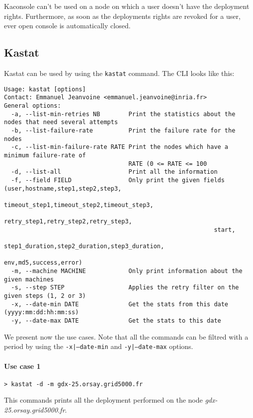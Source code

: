 \documentclass[a4wide,10pt,oneside]{book}
\begin{document}
Kaconsole can't be used on a node on which a user doesn't have the deployment rights. Furthermore, as soon as the deployments rights are revoked for a user, ever open console is automatically closed.

\subsection{Kastat}\label{sec:kastat}
Kastat can be used by using the \texttt{kastat} command. The CLI looks like this:
\begin{small}
\begin{verbatim}
Usage: kastat [options]
Contact: Emmanuel Jeanvoine <emmanuel.jeanvoine@inria.fr>
General options:
  -a, --list-min-retries NB        Print the statistics about the nodes that need several attempts
  -b, --list-failure-rate          Print the failure rate for the nodes
  -c, --list-min-failure-rate RATE Print the nodes which have a minimum failure-rate of 
                                   RATE (0 <= RATE <= 100
  -d, --list-all                   Print all the information
  -f, --field FIELD                Only print the given fields (user,hostname,step1,step2,step3,
                                                           timeout_step1,timeout_step2,timeout_step3,
                                                           retry_step1,retry_step2,retry_step3,
                                                           start,
                                                           step1_duration,step2_duration,step3_duration,
                                                           env,md5,success,error)
  -m, --machine MACHINE            Only print information about the given machines
  -s, --step STEP                  Applies the retry filter on the given steps (1, 2 or 3)
  -x, --date-min DATE              Get the stats from this date (yyyy:mm:dd:hh:mm:ss)
  -y, --date-max DATE              Get the stats to this date
\end{verbatim}
\end{small}

We present now the use cases. Note that all the commands can be filtred with a period by using the \texttt{-x|--date-min} and \texttt{-y|--date-max} options.
\paragraph{Use case 1}
\begin{verbatim}
> kastat -d -m gdx-25.orsay.grid5000.fr
\end{verbatim}
This commands prints all the deployment performed on the node \textit{gdx-25.orsay.grid5000.fr}.
\end{document}
